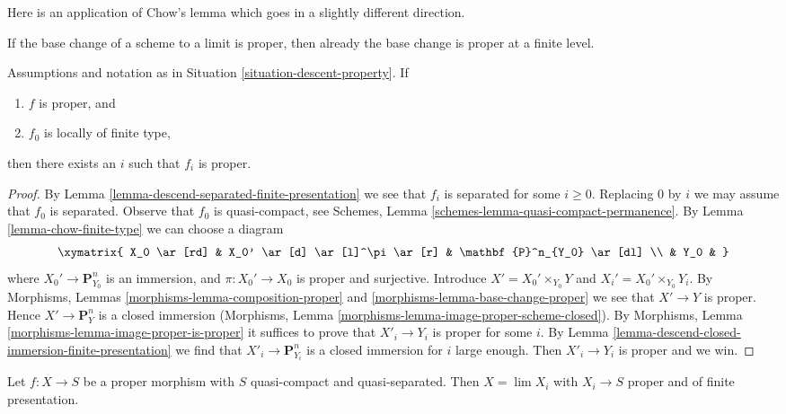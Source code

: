 \noindent
Here is an application of Chow's lemma which goes in a slightly
different direction.

\begin{lemma}
\label{lemma-eventually-proper}
\begin{slogan}
If the base change of a scheme to a limit is proper, then
already the base change is proper at a finite level.
\end{slogan}
Assumptions and notation as in Situation \ref{situation-descent-property}.
If
\begin{enumerate}
\item $f$ is proper, and
\item $f_0$ is locally of finite type,
\end{enumerate}
then there exists an $i$ such that $f_i$ is proper.
\end{lemma}

\begin{proof}
By Lemma \ref{lemma-descend-separated-finite-presentation} we see that
$f_i$ is separated for some $i \geq 0$. Replacing
$0$ by $i$ we may assume that $f_0$ is separated.
Observe that $f_0$ is quasi-compact, see
Schemes, Lemma \ref{schemes-lemma-quasi-compact-permanence}.
By Lemma \ref{lemma-chow-finite-type} we can choose a diagram
$$
\xymatrix{
X_0 \ar[rd] & X_0' \ar[d] \ar[l]^\pi \ar[r] & \mathbf{P}^n_{Y_0} \ar[dl] \\
& Y_0 &
}
$$
where $X_0' \to \mathbf{P}^n_{Y_0}$ is an immersion, and
$\pi : X_0' \to X_0$ is proper and surjective. Introduce
$X' = X_0' \times_{Y_0} Y$ and $X_i' = X_0' \times_{Y_0} Y_i$.
By Morphisms, Lemmas \ref{morphisms-lemma-composition-proper} and
\ref{morphisms-lemma-base-change-proper}
we see that $X' \to Y$ is proper. Hence $X' \to \mathbf{P}^n_Y$ is
a closed immersion (Morphisms, Lemma
\ref{morphisms-lemma-image-proper-scheme-closed}). By
Morphisms, Lemma \ref{morphisms-lemma-image-proper-is-proper}
it suffices to prove that $X'_i \to Y_i$ is proper for some $i$.
By Lemma \ref{lemma-descend-closed-immersion-finite-presentation}
we find that $X'_i \to \mathbf{P}^n_{Y_i}$ is
a closed immersion for $i$ large enough. Then $X'_i \to Y_i$
is proper and we win.
\end{proof}

\begin{lemma}
\label{lemma-proper-limit-of-proper-finite-presentation}
Let $f : X \to S$ be a proper morphism with $S$ quasi-compact and
quasi-separated. Then $X = \lim X_i$ with $X_i \to S$ proper and
of finite presentation.
\end{lemma}

